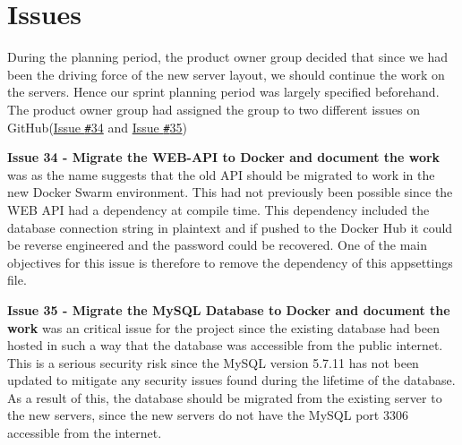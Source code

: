 \section{Issues}\label{SEC:Sprint3Issues}
During the planning period, the product owner group decided that since we had been the driving force of the new server layout, we should continue the work on the servers.
Hence our sprint planning period was largely specified beforehand.
The product owner group had assigned the group to two different issues on GitHub(\href{https://github.com/aau-giraf/wiki/issues/34}{Issue \texttt{\#}34} and \href{https://github.com/aau-giraf/wiki/issues/35}{Issue \texttt{\#}35})

\textbf{Issue 34 - Migrate the WEB-API to Docker and document the work} was as the name suggests that the old API should be migrated to work in the new Docker Swarm environment.
This had not previously been possible since the WEB API had a dependency at compile time.
This dependency included the database connection string in plaintext and if pushed to the Docker Hub it could be reverse engineered and the password could be recovered.
One of the main objectives for this issue is therefore to remove the dependency of this appsettings file.

\textbf{Issue 35 - Migrate the MySQL Database to Docker and document the work} was an critical issue for the project since the existing database had been hosted in such a way that the database was accessible from the public internet.
This is a serious security risk since the MySQL version 5.7.11 has not been updated to mitigate any security issues found during the lifetime of the database.
As a result of this, the database should be migrated from the existing server to the new servers, since the new servers do not have the MySQL port $3306$ accessible from the internet.
